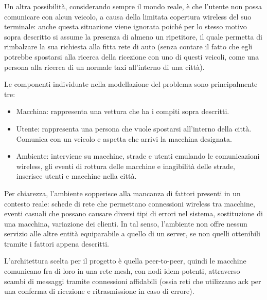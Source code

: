Un altra possibilità, considerando sempre il mondo reale, è che l'utente non possa comunicare con alcun veicolo, a causa della limitata copertura wireless del suo terminale: anche questa situazione viene ignorata poiché per lo stesso motivo sopra descritto si assume la presenza di almeno un ripetitore, il quale permetta di rimbalzare la sua richiesta alla fitta rete di auto (senza contare il fatto che egli potrebbe spostarsi alla ricerca della ricezione con uno di questi veicoli, come una persona alla ricerca di un normale taxi all'interno di una città).

Le componenti individuate nella modellazione del problema sono principalmente tre:
\begin{itemize}
	\item Macchina: rappresenta una vettura che ha i compiti sopra descritti.
	\item Utente: rappresenta una persona che vuole spostarsi all'interno della città. Comunica con un veicolo e aspetta che arrivi la macchina designata.
	\item Ambiente: interviene su macchine, strade e utenti emulando le comunicazioni wireless, gli eventi di rottura delle macchine e inagibilità delle strade, inserisce utenti e macchine nella città.
\end{itemize}

Per chiarezza, l'ambiente sopperisce alla mancanza di fattori presenti in un contesto reale: schede di rete che permettano connessioni wireless tra macchine, eventi casuali che possano causare diversi tipi di errori nel sistema, sostituzione di una macchina, variazione dei clienti. In tal senso, l'ambiente non offre nessun servizio alle altre entità equiparabile a quello di un server, se non quelli ottenibili tramite i fattori appena descritti.

L'architettura scelta per il progetto è quella peer-to-peer, quindi le macchine comunicano fra di loro in una rete mesh, con nodi idem-potenti, attraverso scambi di messaggi tramite connessioni affidabili (ossia reti che utilizzano ack per una conferma di ricezione e ritrasmissione in caso di errore).

